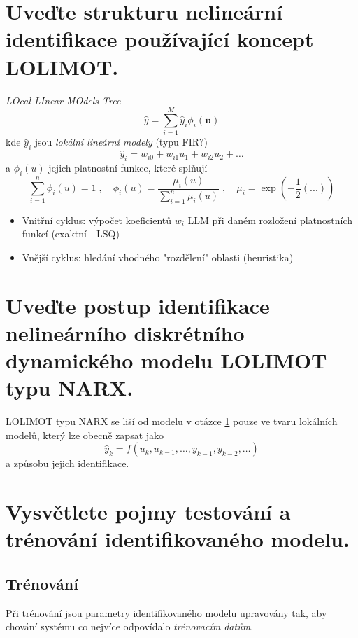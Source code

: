 \documentclass{article}
\begin{document}
	\section{Uveďte strukturu nelineární identifikace používající koncept LOLIMOT. } \label{lolimot}
	\emph{LOcal LInear MOdels Tree}
	\begin{equation}
		\hat{y} = \sum_{i=1}^M \hat{y}_i \phi_i(\bm{u})
	\end{equation}
	kde $\hat{y}_i$ jsou \emph{lokální lineární modely} (typu FIR?)
	\begin{equation}
		\hat{y}_i = w_{i0} + w_{i1} u_1 + w_{i2} u_2 + \dots
	\end{equation}
	a $\phi_i(u)$ jejich platnostní funkce, které splňují
	\begin{equation}
		\sum_{i=1}^n \phi_i(u) = 1
		\;,\quad 
		\phi_i(u) = \frac{\mu_i(u)}{\sum_{i=1}^n \mu_i(u)}
		\;,\quad 
		\mu_i = \exp(-\frac{1}{2}(...))
	\end{equation}

	\begin{itemize}
	\item Vnitřní cyklus: výpočet koeficientů $w_i$ LLM při daném rozložení platnostních funkcí (exaktní - LSQ)
	\item Vnější cyklus: hledání vhodného "rozdělení" oblasti (heuristika)
	\end{itemize}


	\section{Uveďte postup identifikace nelineárního diskrétního dynamického modelu LOLIMOT typu NARX. }

	LOLIMOT typu NARX se liší od modelu v otázce \ref{lolimot} pouze ve tvaru lokálních modelů, který lze obecně zapsat jako
	\begin{equation}
		\hat{y}_k = f(u_k,u_{k-1},\dots,y_{k-1},y_{k-2},\dots)
	\end{equation}
	a způsobu jejich identifikace.

	\section{Vysvětlete pojmy testování a trénování identifikovaného modelu.}

	\subsection*{Trénování}
	Při trénování jsou parametry identifikovaného modelu upravovány tak, aby chování systému co nejvíce odpovídalo \emph{trénovacím datům}.
\end{document}
